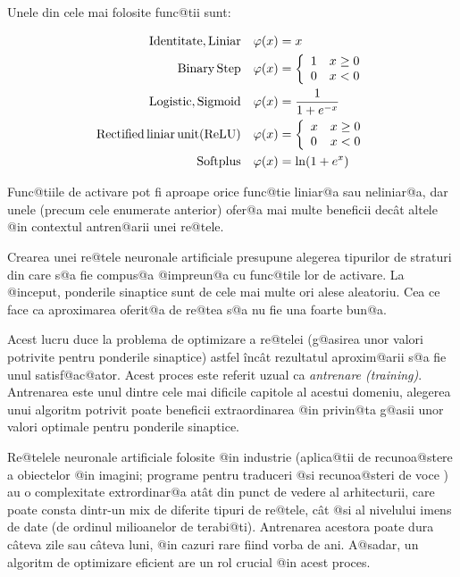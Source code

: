 Unele din cele mai folosite func@tii sunt:

\begin{align}
	{\rm Identitate, Liniar} \quad \varphi (x) &= x \label{eq:liniar} \\
	{\rm Binary \, Step} \quad \varphi (x) &= \left\lbrace
		\begin{array}{lc}
			1 & x \geq 0 \\
			0 & x < 0
		\end{array}
	\right. \\
	{\rm Logistic, Sigmoid} \quad \varphi (x) &= \displaystyle\frac{1}{1 + e^{-x}} \\
	{\rm Rectified\, liniar\, unit (ReLU)} \quad \varphi (x) &= \left\lbrace
		\begin{array}{lc}
			x & x \geq 0 \\
			0 & x < 0
		\end{array}
	\right. \label{eq:relu} \\
	{\rm Softplus} \quad \varphi (x) &= \ln ( 1 + e^x) 
\end{align}

Func@tiile de activare pot fi aproape orice func@tie liniar@a sau neliniar@a, dar unele  (precum cele enumerate anterior) ofer@a mai multe beneficii dec\^ at altele @in contextul antren@arii unei re@tele.

Crearea unei re@tele neuronale artificiale presupune alegerea tipurilor de straturi din care s@a fie compus@a @impreun@a cu func@tile lor de activare. La @inceput, ponderile sinaptice sunt de cele mai multe ori alese aleatoriu. Cea ce face ca aproximarea oferit@a de re@tea s@a nu fie una foarte bun@a.

Acest lucru duce la problema de optimizare a re@telei (g@asirea unor valori potrivite pentru ponderile sinaptice) astfel \^inc\^ at rezultatul aproxim@arii s@a fie unul satisf@ac@ator. Acest proces este referit uzual ca {\sl antrenare (training)}. Antrenarea este unul dintre cele mai dificile capitole al acestui domeniu, alegerea unui algoritm potrivit poate beneficii extraordinarea @in privin@ta g@asii unor valori optimale pentru ponderile sinaptice.

Re@telele neuronale artificiale folosite @in industrie (aplica@tii de recunoa@stere a obiectelor @in imagini; programe pentru traduceri @si recunoa@steri de voce ) au o complexitate extrordinar@a at\^ at din punct de vedere al arhitecturii, care poate consta dintr-un mix de diferite tipuri de re@tele, c\^ at @si al nivelului imens de date (de ordinul milioanelor de terabi@ti). Antrenarea acestora poate dura c\^ ateva zile sau c\^ ateva luni, @in cazuri rare fiind vorba de ani. A@sadar, un algoritm de optimizare eficient are un rol crucial @in acest proces.

